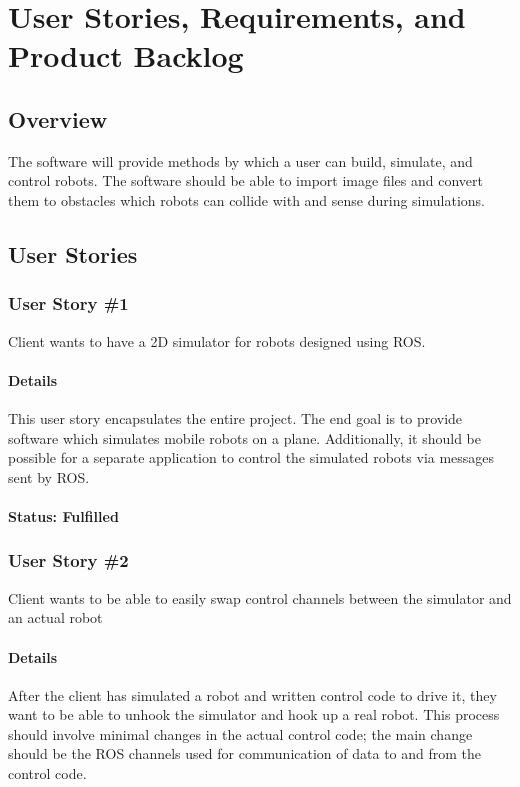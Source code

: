 
\chapter{User Stories,  Requirements, and Product Backlog}
\section{Overview}
The software will provide methods by which a user can build, simulate, and control robots. The software should be able to import image files and convert them to obstacles which robots can collide with and sense during simulations.

\section{User Stories}
\subsection{User Story \#1}
Client wants to have a 2D simulator for robots designed using ROS.

\subsubsection*{Details}
This user story encapsulates the entire project. The end goal is to provide software which simulates mobile robots on a plane. Additionally, it should be possible for a separate application to control the simulated robots via messages sent by ROS.

\subsubsection*{Status: Fulfilled}

\subsection{User Story \#2} 
Client wants to be able to easily swap control channels between the simulator and an actual robot

\subsubsection*{Details}
After the client has simulated a robot and written control code to drive it, they want to be able to unhook the simulator and hook up a real robot. This process should involve minimal changes in the actual control code; the main change should be the ROS channels used for communication of data to and from the control code.

